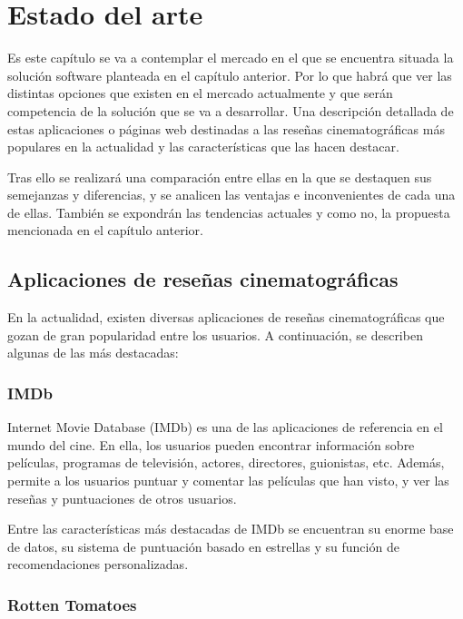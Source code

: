 \chapter{Estado del arte}

Es este capítulo se va a contemplar el mercado en el que se encuentra situada la solución software 
planteada en el capítulo anterior. Por lo que habrá que ver las distintas opciones que existen en el 
mercado actualmente y que serán competencia de la solución que se va a desarrollar. Una descripción 
detallada de estas aplicaciones o páginas web destinadas a las reseñas cinematográficas más populares 
en la actualidad y las características que las hacen destacar.

Tras ello se realizará una comparación entre ellas en la que se destaquen sus semejanzas y 
diferencias, y se analicen las ventajas e inconvenientes de cada una de ellas. También se expondrán 
las tendencias actuales y como no, la propuesta mencionada en el capítulo anterior.

\section{Aplicaciones de reseñas cinematográficas}

En la actualidad, existen diversas aplicaciones de reseñas cinematográficas que gozan de gran 
popularidad entre los usuarios. A continuación, se describen algunas de las más destacadas:

\subsection{IMDb}

Internet Movie Database (IMDb) es una de las aplicaciones de referencia en el mundo del cine. En ella, 
los usuarios pueden encontrar información sobre películas, programas de televisión, actores, 
directores, guionistas, etc. Además, permite a los usuarios puntuar y comentar las películas que han 
visto, y ver las reseñas y puntuaciones de otros usuarios.

Entre las características más destacadas de IMDb se encuentran su enorme base de datos, su sistema de 
puntuación basado en estrellas y su función de recomendaciones personalizadas.

\subsection{Rotten Tomatoes}

